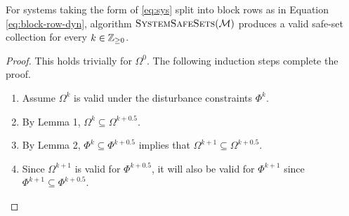 \begin{lemma}
For systems taking the form of \ref{eq:sys} split into block rows as in Equation \autoref{eq:block-row-dyn}, algorithm $\Call{SystemSafeSets}{\agents}$ produces a valid safe-set collection for every $k\in\mathbb{Z}_{\geq 0}$. 
\end{lemma}
\begin{proof}
This holds trivially for $\Omega^0$. The following induction steps complete the proof.
\begin{enumerate}
	\item Assume $\Omega^k$ is valid under the disturbance constraints $\Phi^k$.
	\item By Lemma 1, $\Omega^k\subseteq\Omega^{k+0.5}$.
	\item By Lemma 2, $\Phi^k\subseteq\Phi^{k+0.5}$ implies that $\Omega^{k+1}\subseteq\Omega^{k+0.5}$.
	\item Since $\Omega^{k+1}$ is valid for $\Phi^{k+0.5}$, it will also be valid for $\Phi^{k+1}$ since $\Phi^{k+1}\subseteq\Phi^{k+0.5}$.
\end{enumerate}
\end{proof}